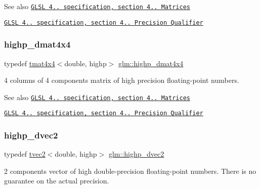 \begin{DoxySeeAlso}{See also}
\href{http://www.opengl.org/registry/doc/GLSLangSpec.4.20.8.pdf}{\tt G\+L\+SL 4.. specification, section 4.. Matrices} 

\href{http://www.opengl.org/registry/doc/GLSLangSpec.4.20.8.pdf}{\tt G\+L\+SL 4.. specification, section 4.. Precision Qualifier} 
\end{DoxySeeAlso}
\mbox{\label{group__core__precision_ga46855bd8fdcb8dbc7db5d2aaeb91be69}} 
\subsubsection{\texorpdfstring{highp\+\_\+dmat4x4}{highp\_dmat4x4}}
{\footnotesize\ttfamily typedef \hyperlink{structglm_1_1tmat4x4}{tmat4x4}$<$double, highp$>$ \hyperlink{group__core__precision_ga46855bd8fdcb8dbc7db5d2aaeb91be69}{glm\+::highp\+\_\+dmat4x4}}

4 columns of 4 components matrix of high precision floating-\/point numbers.

\begin{DoxySeeAlso}{See also}
\href{http://www.opengl.org/registry/doc/GLSLangSpec.4.20.8.pdf}{\tt G\+L\+SL 4.. specification, section 4.. Matrices} 

\href{http://www.opengl.org/registry/doc/GLSLangSpec.4.20.8.pdf}{\tt G\+L\+SL 4.. specification, section 4.. Precision Qualifier} 
\end{DoxySeeAlso}
\mbox{\label{group__core__precision_ga74ad90a083be6c50f6c285d6ab15a198}} 
\subsubsection{\texorpdfstring{highp\+\_\+dvec2}{highp\_dvec2}}
{\footnotesize\ttfamily typedef \hyperlink{structglm_1_1tvec2}{tvec2}$<$double, highp$>$ \hyperlink{group__core__precision_ga74ad90a083be6c50f6c285d6ab15a198}{glm\+::highp\+\_\+dvec2}}

2 components vector of high double-\/precision floating-\/point numbers. There is no guarantee on the actual precision.

